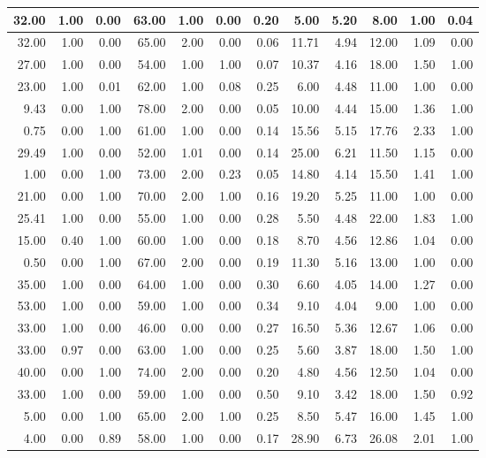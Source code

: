 \documentclass[
]{article}
\begin{document}
\begin{tabular}{r|r|r|r|r|r|r|r|r|r|r|r}
\hline
32.00 & 1.00 & 0.00 & 63.00 & 1.00 & 0.00 & 0.20 & 5.00 & 5.20 & 8.00 & 1.00 & 0.04\\
\hline
32.00 & 1.00 & 0.00 & 65.00 & 2.00 & 0.00 & 0.06 & 11.71 & 4.94 & 12.00 & 1.09 & 0.00\\
\hline
27.00 & 1.00 & 0.00 & 54.00 & 1.00 & 1.00 & 0.07 & 10.37 & 4.16 & 18.00 & 1.50 & 1.00\\
\hline
23.00 & 1.00 & 0.01 & 62.00 & 1.00 & 0.08 & 0.25 & 6.00 & 4.48 & 11.00 & 1.00 & 0.00\\
\hline
9.43 & 0.00 & 1.00 & 78.00 & 2.00 & 0.00 & 0.05 & 10.00 & 4.44 & 15.00 & 1.36 & 1.00\\
\hline
0.75 & 0.00 & 1.00 & 61.00 & 1.00 & 0.00 & 0.14 & 15.56 & 5.15 & 17.76 & 2.33 & 1.00\\
\hline
29.49 & 1.00 & 0.00 & 52.00 & 1.01 & 0.00 & 0.14 & 25.00 & 6.21 & 11.50 & 1.15 & 0.00\\
\hline
1.00 & 0.00 & 1.00 & 73.00 & 2.00 & 0.23 & 0.05 & 14.80 & 4.14 & 15.50 & 1.41 & 1.00\\
\hline
21.00 & 0.00 & 1.00 & 70.00 & 2.00 & 1.00 & 0.16 & 19.20 & 5.25 & 11.00 & 1.00 & 0.00\\
\hline
25.41 & 1.00 & 0.00 & 55.00 & 1.00 & 0.00 & 0.28 & 5.50 & 4.48 & 22.00 & 1.83 & 1.00\\
\hline
15.00 & 0.40 & 1.00 & 60.00 & 1.00 & 0.00 & 0.18 & 8.70 & 4.56 & 12.86 & 1.04 & 0.00\\
\hline
0.50 & 0.00 & 1.00 & 67.00 & 2.00 & 0.00 & 0.19 & 11.30 & 5.16 & 13.00 & 1.00 & 0.00\\
\hline
35.00 & 1.00 & 0.00 & 64.00 & 1.00 & 0.00 & 0.30 & 6.60 & 4.05 & 14.00 & 1.27 & 0.00\\
\hline
53.00 & 1.00 & 0.00 & 59.00 & 1.00 & 0.00 & 0.34 & 9.10 & 4.04 & 9.00 & 1.00 & 0.00\\
\hline
33.00 & 1.00 & 0.00 & 46.00 & 0.00 & 0.00 & 0.27 & 16.50 & 5.36 & 12.67 & 1.06 & 0.00\\
\hline
33.00 & 0.97 & 0.00 & 63.00 & 1.00 & 0.00 & 0.25 & 5.60 & 3.87 & 18.00 & 1.50 & 1.00\\
\hline
40.00 & 0.00 & 1.00 & 74.00 & 2.00 & 0.00 & 0.20 & 4.80 & 4.56 & 12.50 & 1.04 & 0.00\\
\hline
33.00 & 1.00 & 0.00 & 59.00 & 1.00 & 0.00 & 0.50 & 9.10 & 3.42 & 18.00 & 1.50 & 0.92\\
\hline
5.00 & 0.00 & 1.00 & 65.00 & 2.00 & 1.00 & 0.25 & 8.50 & 5.47 & 16.00 & 1.45 & 1.00\\
\hline
4.00 & 0.00 & 0.89 & 58.00 & 1.00 & 0.00 & 0.17 & 28.90 & 6.73 & 26.08 & 2.01 & 1.00\\

\end{tabular}
\end{document}
